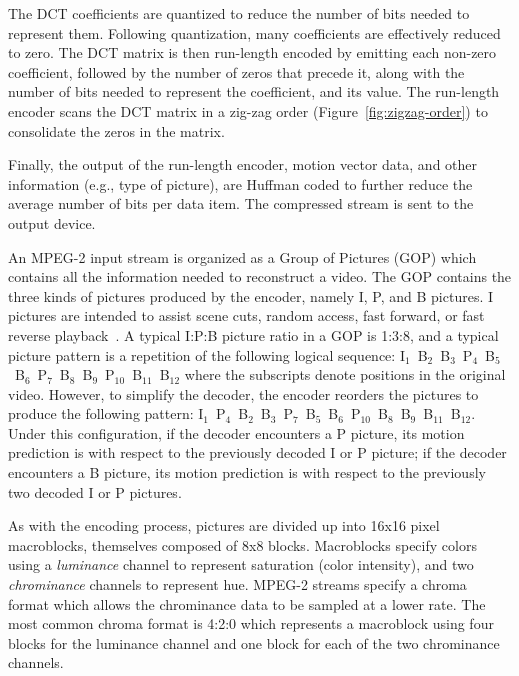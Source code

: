 The DCT coefficients are quantized to reduce the number of bits needed
to represent them. Following quantization, many coefficients are
effectively reduced to zero. The DCT matrix is then run-length encoded
by emitting each non-zero coefficient,
followed by the number of zeros that precede it, along with the number
of bits needed to represent the coefficient, and its value. The
run-length encoder scans the DCT matrix in a zig-zag order
(Figure~\ref{fig:zigzag-order}) to consolidate the zeros in the matrix.

Finally, the output of the run-length encoder, motion vector data,
and other information (e.g., type of picture), are Huffman coded to
further reduce the average number of bits per data item. The compressed
stream is sent to the output device.


An MPEG-2 input stream is organized as a Group of Pictures (GOP) which
contains all the information needed to reconstruct a video. The GOP
contains the three kinds of pictures produced by the encoder, namely
I, P, and B pictures. I pictures are intended to assist scene cuts,
random access, fast forward, or fast reverse
playback~\cite[p. 14]{MPEG2}. A typical I:P:B picture ratio in a GOP
is 1:3:8, and a typical picture pattern is a repetition of the
following logical sequence:
I$_1$~B$_2$~B$_3$~P$_4$~B$_5$~B$_6$~P$_7$~B$_8$~B$_9$~P$_{10}$~B$_{11}$~B$_{12}$
where the subscripts denote positions in the original video.  However,
to simplify the decoder, the encoder reorders the pictures to produce
the following pattern:
I$_1$~P$_4$~B$_2$~B$_3$~P$_7$~B$_5$~B$_6$~P$_{10}$~B$_8$~B$_9$~B$_{11}$~B$_{12}$.
Under this configuration, if the decoder encounters a P picture, its
motion prediction is with respect to the previously decoded I or P
picture; if the decoder encounters a B picture, its motion prediction
is with respect to the previously two decoded I or P pictures.

As with the encoding process, pictures are divided up into 16x16 pixel
macroblocks, themselves composed of 8x8 blocks. Macroblocks
specify colors using a {\it luminance} channel to represent saturation
(color intensity), and two {\it chrominance} channels to represent
hue. MPEG-2 streams specify a chroma format which allows the
chrominance data to be sampled at a lower rate. The most common chroma
format is 4:2:0 which represents a macroblock using four blocks for the
luminance channel and one block for each of the two chrominance
channels.

